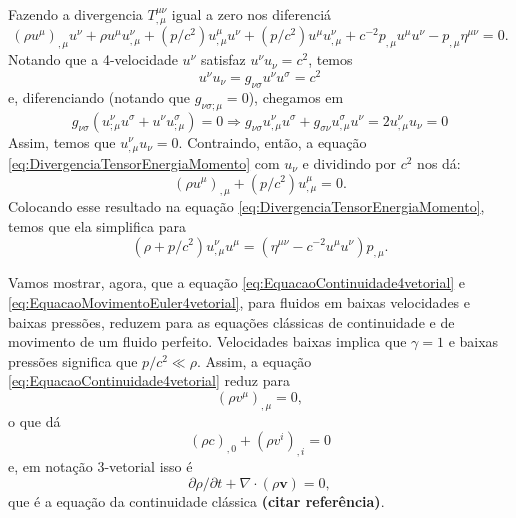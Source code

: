 Fazendo a divergencia $T^{\mu\nu}_{,\mu}$ igual a zero nos diferenciá
\begin{equation}\label{eq:DivergenciaTensorEnergiaMomento}
	\left(\rho u^{\mu}\right)_{, \mu} u^{\nu}+\rho u^{\mu} u_{, \mu}^{\nu}+\left(p / c^{2}\right) u_{, \mu}^{\mu} u^{\nu}+\left(p / c^{2}\right) u^{\mu} u_{, \mu}^{\nu}+c^{-2} p_{, \mu} u^{\mu} u^{\nu}-p_{, \mu} \eta^{\mu \nu}=0.
\end{equation}
Notando que a 4-velocidade $u^\nu$ satisfaz $u^{\nu}u_\nu=c^2$, temos
\[
	u^\nu u_\nu = g_{\nu\sigma}u^\nu u^\sigma = c^2
\]
e, diferenciando {\color{ForestGreen} (notando que $g_{\nu\sigma;\mu}=0$)}, chegamos em
\[
	g_{\nu\sigma}\left(u^{\nu}_{;\mu}u^{\sigma}+u^{\nu}u^{\sigma}_{;\mu}\right)=0 
	\Rightarrow g_{\nu\sigma}u^{\nu}_{,\mu}u^{\sigma}+g_{\sigma\nu}u^{\sigma}_{,\mu}u^{\nu}= 2u_{,\mu}^{\nu} u_{\nu} = 0
\]
Assim, temos que $u_{,\mu}^{\nu} u_{\nu} = 0$. Contraindo, então, a equação \eqref{eq:DivergenciaTensorEnergiaMomento} com $u_\nu$ e dividindo por $c^2$ nos dá:
\begin{equation}\label{eq:EquacaoContinuidade4vetorial}
	\boxed{
		\left(\rho u^{\mu}\right)_{, \mu}+\left(p / c^{2}\right) u_{, \mu}^{\mu}=0.
	}
\end{equation}
Colocando esse resultado na equação \eqref{eq:DivergenciaTensorEnergiaMomento}, temos que ela simplifica para
\begin{equation}\label{eq:EquacaoMovimentoEuler4vetorial}
	\boxed{
		\left(\rho+p / c^{2}\right) u_{, \mu}^{\nu} u^{\mu}=\left(\eta^{\mu \nu}-c^{-2} u^{\mu} u^{\nu}\right) p_{, \mu}	.
	}
\end{equation}

Vamos mostrar, agora, que a equação \eqref{eq:EquacaoContinuidade4vetorial} e \eqref{eq:EquacaoMovimentoEuler4vetorial}, para fluidos em baixas velocidades e baixas pressões, reduzem para as equações clássicas de continuidade e de movimento de um fluido perfeito. Velocidades baixas implica que $\gamma=1$ e baixas pressões significa que $p/c^2 \ll \rho$. Assim, a equação  \eqref{eq:EquacaoContinuidade4vetorial}  reduz para
\[\left(\rho v^{\mu}\right)_{, \mu}=0,\]
o que dá
\[(\rho c)_{, 0}+\left(\rho v^{i}\right)_{, i}=0\]
e, em notação 3-vetorial isso é
\begin{equation}\label{eq:EquacaoContinuidadeClassica3vetorial}
	\boxed{
		\partial \rho / \partial t+\nabla \cdot(\rho \mathbf{v})=0,
	}
\end{equation}
que é a equação da continuidade clássica \textbf{(citar referência)}.

